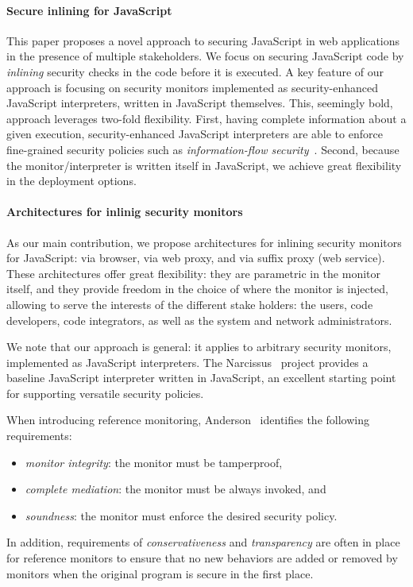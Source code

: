 \documentclass{llncs}
\begin{document}
\paragraph{Secure inlining for JavaScript}
This paper proposes a novel approach to securing JavaScript in web
applications in the presence of multiple stakeholders.
%
We focus on securing JavaScript code by \emph{inlining}
security checks in the code before it is executed.
%
A key feature
of our approach is focusing on security monitors implemented as
security-enhanced JavaScript interpreters, written in JavaScript
themselves. This, seemingly bold, approach leverages two-fold
flexibility. First, having complete information about a given
execution, security-enhanced JavaScript interpreters are able to
enforce fine-grained security policies such as \emph{information-flow
security}~\cite{Sabelfeld:Myers:JSAC}. Second, because the monitor/interpreter is written itself in
JavaScript, we achieve great flexibility in the deployment options.

\paragraph{Architectures for inlinig security monitors}
As our main contribution,
we propose architectures for inlining security monitors for JavaScript: via
browser, via web proxy, and via suffix proxy (web service). 
%
These architectures offer great flexibility: they are parametric in the monitor itself,
and they provide freedom in the choice of where the monitor is
injected, allowing to serve the interests of the different stake
holders: the users, code developers, code
integrators, as well as the system and network administrators.

We note that our approach is general: it applies to arbitrary security
monitors, implemented as JavaScript interpreters. The 
 Narcissus~\cite{Narcissus} project provides a baseline JavaScript
 interpreter written in JavaScript, an excellent starting
 point for supporting versatile security policies.

When introducing reference monitoring, Anderson~\cite{Anderson:72}
identifies the following requirements:
\begin{itemize}
\item \emph{monitor integrity}: the monitor must be tamperproof,
\item \emph{complete mediation}: the monitor must be always invoked, and
\item \emph{soundness}: the monitor must enforce the desired
  security policy.
\end{itemize}
In addition, requirements of \emph{conservativeness} and
\emph{transparency} are often in place for reference monitors to
ensure that no new behaviors are added or removed by monitors when the
original program is secure in the first place.
\end{document}
